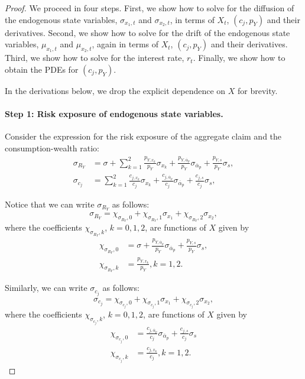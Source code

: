 \begin{proof}
    We proceed in four steps. 
    First, we show how to solve for the diffusion of the endogenous state variables, $\sigma_{x_1,t}$ and $\sigma_{x_2,t}$, in terms of $X_t$, $(c_j,p_Y)$ and their derivatives.
    Second, we show how to solve for the drift of the endogenous state variables, $\mu_{x_1,t}$ and $\mu_{x_2,t}$, again in terms of $X_t$, $(c_j,p_Y)$ and their derivatives.
    Third, we show how to solve for the interest rate, $r_t$.
    Finally, we show how to obtain the PDEs for $(c_j,p_Y)$.

    In the derivations below, we drop the explicit dependence on $X$ for brevity.

    \paragraph{Step 1: Risk exposure of endogenous state variables.}
    Consider the expression for the risk exposure of the aggregate claim and the consumption-wealth ratio:
    \begin{align}
        \sigma_{R_Y} &= \sigma + \sum_{k=1}^2 \frac{p_{Y,x_k}}{p_{Y}} \sigma_{x_k} + \frac{p_{Y,\overline{\alpha}_p}}{p_{Y}} \sigma_{\overline{\alpha}_p} + \frac{p_{Y,s}}{p_{Y}} \sigma_{s},\\
        \sigma_{c_j} &= \sum_{k=1}^2 \frac{c_{j,x_k}}{c_{j}} \sigma_{x_k} + \frac{c_{j,\overline{\alpha}_p}}{c_{j}} \sigma_{\overline{\alpha}_p} + \frac{c_{j,s}}{c_{j}} \sigma_{s},
    \end{align}
    
    Notice that we can write $\sigma_{R_Y}$ as follows:
    \begin{equation}
        \sigma_{R_Y} = \chi_{\sigma_{R_Y},0} + \chi_{\sigma_{R_Y},1} \sigma_{x_1} + \chi_{\sigma_{R_Y},2} \sigma_{x_2},
    \end{equation}
    where the coefficients $\chi_{\sigma_{R_Y},k}$, $k=0,1,2$, are functions of $X$ given by 
    \begin{align}
        \chi_{\sigma_{R_Y},0} &= \sigma  +\frac{p_{Y,\overline{\alpha}_p}}{p_{Y}} \sigma_{\overline{\alpha}_p} + \frac{p_{Y,s}}{p_{Y}} \sigma_{s} ,\\
        \chi_{\sigma_{R_Y},k} &= \frac{p_{Y,x_k}}{p_{Y}}, k=1,2.
    \end{align}

    Similarly, we can write $\sigma_{c_j}$ as follows:
    \begin{equation}
        \sigma_{c_j} = \chi_{\sigma_{c_j},0} + \chi_{\sigma_{c_j},1} \sigma_{x_1} + \chi_{\sigma_{c_j},2} \sigma_{x_2},
    \end{equation}
    where the coefficients $\chi_{\sigma_{c_j},k}$, $k=0,1,2$, are functions of $X$ given by 
    \begin{align}
        \chi_{\sigma_{c_j},0} &= \frac{c_{j,\overline{\alpha}_p}}{c_{j}} \sigma_{\overline{\alpha}_p} + \frac{c_{j,s}}{c_{j}} \sigma_{s}\\
        \chi_{\sigma_{c_j},k} &= \frac{c_{j,x_k}}{c_{j}}, k=1,2.
    \end{align}


\end{proof}
